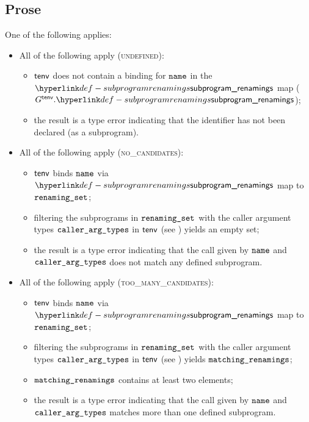\subsection{Prose}
One of the following applies:
\begin{itemize}
  \item All of the following apply (\textsc{undefined}):
  \begin{itemize}
    \item $\textsf{tenv}$ does not contain a binding for $\texttt{name}$ in the $\subprogramrenamings$ map
          ($G^\tenv.\subprogramrenamings$);
    \item the result is a type error indicating that the identifier has not been declared (as a subprogram).
  \end{itemize}

  \item All of the following apply (\textsc{no\_candidates}):
  \begin{itemize}
    \item $\textsf{tenv}$ binds $\texttt{name}$ via $\subprogramrenamings$ map to $\texttt{renaming\_set}$;
    \item filtering the subprograms in $\texttt{renaming\_set}$ with the caller argument types $\texttt{caller\_arg\_types}$
          in $\textsf{tenv}$ (see ) yields an empty set\ProseOrTypeError;
    \item the result is a type error indicating that the call given by $\texttt{name}$ and \\ $\texttt{caller\_arg\_types}$
          does not match any defined subprogram.
  \end{itemize}

  \item All of the following apply (\textsc{too\_many\_candidates}):
  \begin{itemize}
    \item $\textsf{tenv}$ binds $\texttt{name}$ via $\subprogramrenamings$ map to $\texttt{renaming\_set}$;
    \item filtering the subprograms in $\texttt{renaming\_set}$ with the caller argument types $\texttt{caller\_arg\_types}$
          in $\textsf{tenv}$ (see ) yields $\texttt{matching\_renamings}$\ProseOrTypeError;
    \item $\texttt{matching\_renamings}$ contains at least two elements;
    \item the result is a type error indicating that the call given by $\texttt{name}$ and \\
          $\texttt{caller\_arg\_types}$ matches more than one defined subprogram.
  \end{itemize}


\end{itemize}
